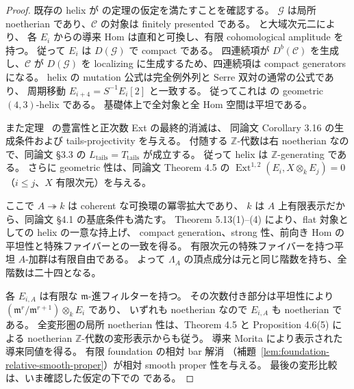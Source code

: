 \begin{proof}
既存の helix が \cite{DeDekenLowen2011} の定理の仮定を満たすことを確認する。
$\mathcal G$ は局所 noetherian であり、$\mathcal C$ の対象は finitely presented である。
\cite[Proposition 6.34]{LowenVanDenBergh2006} と大域次元二により、
各 $E_i$ からの導来 Hom は直和と可換し、有限 cohomological amplitude を持つ。
従って $E_i$ は $D(\mathcal G)$ で compact である。
四連続項が $D^b(\mathcal C)$ を生成し、$\mathcal C$ が $D(\mathcal G)$ を
localizing に生成するため、四連続項は compact generators になる。
helix の mutation 公式は完全例外列と Serre 双対の通常の公式であり、
周期移動 $E_{i+4}=S^{-1}E_i[2]$ と一致する。
従ってこれは \cite[Definition 5.12]{DeDekenLowen2011} の geometric $(4,3)$-helix である。
基礎体上で全対象と全 Hom 空間は平坦である。

また定理~\cite[\texttt{thm:normal-helix}]{QuadricIntrinsic2026} の豊富性と正次数 Ext の最終的消滅は、
同論文 Corollary 3.16 の生成条件および tails-projectivity を与える。
付随する $\mathbb Z$-代数は右 noetherian なので、同論文 \S3.3 の
$L_{\mathrm{tails}}=T_{\mathrm{tails}}$ が成立する。
従って helix は $\mathbb Z$-generating である。
さらに geometric 性は、同論文 Theorem 4.5 の
$\operatorname{Ext}^{1,2}(E_i,X\otimes_k E_j)=0$（$i\le j$、$X$ 有限次元）を与える。

ここで $A\twoheadrightarrow k$ は coherent な可換環の冪零拡大であり、
$k$ は $A$ 上有限表示だから、同論文 \S4.1 の基底条件も満たす。
Theorem 5.13(1)--(4) により、flat 対象としての helix の一意な持上げ、
compact generation、strong 性、前向き Hom の平坦性と特殊ファイバーとの一致を得る。
有限次元の特殊ファイバーを持つ平坦 $A$-加群は有限自由である。
よって $\Lambda_A$ の頂点成分は元と同じ階数を持ち、全階数は二十四となる。

各 $E_{i,A}$ は有限な $\mathfrak m$-進フィルターを持つ。
その次数付き部分は平坦性により
$(\mathfrak m^r/\mathfrak m^{r+1})\otimes_k E_i$ であり、
いずれも noetherian なので $E_{i,A}$ も noetherian である。
全変形圏の局所 noetherian 性は、Theorem 4.5 と Proposition 4.6(5) による
noetherian $\mathbb Z$-代数の変形表示からも従う。
導来 Morita により表示された導来同値を得る。
有限 foundation の相対 bar 解消
（補題~\ref{lem:foundation-relative-smooth-proper}）が相対 smooth proper 性を与える。
最後の変形比較は、いま確認した仮定の下での
\cite[Theorem 5.15]{DeDekenLowen2011} である。
\end{proof}

